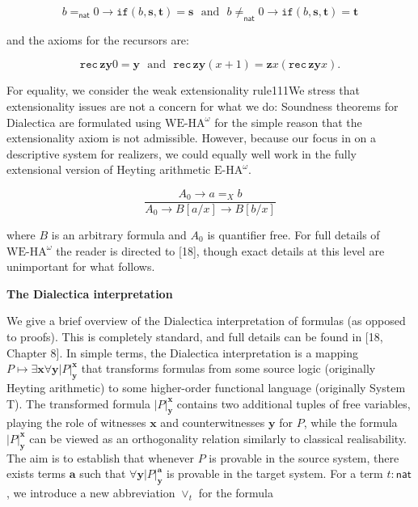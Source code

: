 \par  \quad  \[b=_{\mathsf{nat}}0\to\mathtt{if}({b},{\bm{s}},{\bm{t}})=\bm{s}\ \ \ \mbox{and}\ \ \ b\neq_{\mathsf{nat}}0\to\mathtt{if}({b},{\bm{s}},{\bm{t}})=\bm{t}\]\quad  \quad  
  
and the axioms for the recursors are:\par
  
\par  \quad  \[\mathtt{rec}\,\bm{z}\bm{y}0=\bm{y}\ \ \ \mbox{and}\ \ \ \mathtt{rec}\,\bm{z}\bm{y}(x+1)=\bm{z}x(\mathtt{rec}\,\bm{z}\bm{y}x).\]\quad  \quad  
  
For equality, we consider the weak extensionality rule111We stress that extensionality issues are not a concern for what we do: Soundness theorems for Dialectica are formulated using $\mathrm{WE}\mbox{-}\mathrm{HA}^{\omega}$ for the simple reason that the extensionality axiom is not admissible. However, because our focus in on a descriptive system for realizers, we could equally well work in the fully extensional version of Heyting arithmetic $\mathrm{E}\mbox{-}\mathrm{HA}^{\omega}$.\par
  
\par  \quad  \[\frac{A_{0}\to a=_{X}b}{A_{0}\to B[a/x]\to B[b/x]}\]\quad  \quad  
  
where $B$ is an arbitrary formula and $A_{0}$ is quantifier free. For full details of $\mathrm{WE}\mbox{-}\mathrm{HA}^{\omega}$ the reader is directed to [18], though exact details at this level are unimportant for what follows.\par
 
 
 
 
\par\medskip\noindent\textbf{The Dialectica interpretation}\par
 
 
We give a brief overview of the Dialectica interpretation of formulas (as opposed to proofs). This is completely standard, and full details can be found in [18, Chapter 8]. In simple terms, the Dialectica interpretation is a mapping $P\mapsto\exists\bm{x}\forall\bm{y}|{P}|^{\bm{x}}_{\bm{y}}$ that transforms formulas from some source logic (originally Heyting arithmetic) to some higher-order functional language (originally System T). The transformed formula $|{P}|^{\bm{x}}_{\bm{y}}$ contains two additional tuples of free variables, playing the role of witnesses $\bm{x}$ and counterwitnesses $\bm{y}$ for $P$, while the formula $|{P}|^{\bm{x}}_{\bm{y}}$ can be viewed as an orthogonality relation similarly to classical realisability. The aim is to establish that whenever $P$ is provable in the source system, there exists terms $\bm{a}$ such that $\forall\bm{y}|{P}|^{\bm{a}}_{\bm{y}}$ is provable in the target system. For a term $t:\mathsf{nat}$, we introduce a new abbreviation $\vee_{t}$ for the formula\par
  
